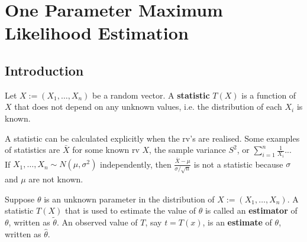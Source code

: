 \documentclass[11pt,fleqn]{book} %
\begin{document}



\chapter{One Parameter Maximum Likelihood Estimation}


\section{Introduction}

\begin{definition} \label{def:511}
Let \(X := (X_1, \ldots, X_n)\) be a random vector. A \textbf{statistic} \(T(X)\) is a function of \(X\) that does not depend on any unknown values, i.e. the distribution of each \(X_i\) is known.
\end{definition}

\begin{remark} \label{rmk:512}
A statistic can be calculated explicitly when the rv's are realised. Some examples of statistics are \(\bar{X}\) for some known rv \(X\), the sample variance \(S^2\), or \(\sum_{i=1}^n \frac{1}{X_i}\)...\\
\indent If \(X_1, \ldots, X_n \sim N(\mu, \sigma^2)\) independently, then \(\frac{\bar{X} - \mu}{\sigma/\sqrt{n}}\) is not a statistic because \(\sigma\) and \(\mu\) are not known.
\end{remark}

\begin{definition} \label{def:513}
Suppose \(\theta\) is an unknown parameter in the distribution of \(X := (X_1, \ldots, X_n)\). A statistic \(T(X)\) that is used to estimate the value of \(\theta\) is called an \textbf{estimator} of \(\theta\), written as \(\tilde{\theta}\). An observed value of \(T\), say \(t = T(x)\), is an \textbf{estimate} of \(\theta\), written as \(\hat{\theta}\).
\end{definition}
\end{document}

